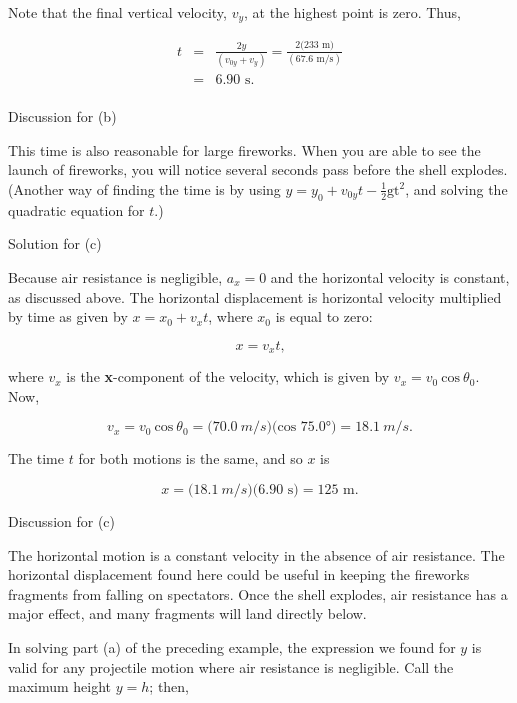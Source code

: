 \documentclass[
]{book}
\begin{document}
Note that the final vertical velocity, \(v_{y}{}\), at the highest point
is zero. Thus,

\leavevmode{}%
\[\begin{array}{lll}
t & = & {\frac{2y}{({v_{0y} + v_{y}})} = \frac{{2(\text{233\ m}})}{(\text{67.6\ m/s})}} \\
 & = & {\text{6.90\ s}\text{.}} \\
\end{array}{}\]

{Discussion for (b)}

This time is also reasonable for large fireworks. When you are able to
see the launch of fireworks, you will notice several seconds pass before
the shell explodes. (Another way of finding the time is by using
\({{y = {y_{0} + v_{0y}}}{t - \frac{1}{2}}\text{gt}^{2}}{}\), and solving
the quadratic equation for \(t{}\).)

{Solution for (c)}

Because air resistance is negligible, \({a_{x} = 0}{}\) and the horizontal
velocity is constant, as discussed above. The horizontal displacement is
horizontal velocity multiplied by time as given by
\({{x = {x_{0} + v_{x}}}t}{}\), where \(x_{0}{}\) is equal to zero:

\leavevmode{}%
\[{{x = v_{x}}t\text{,}}{}\]

where \(v_{x}{}\) is the \textbf{x}-component of the velocity, which is given
by \({{v_{x} = v_{0}}\ \text{cos}\ \theta_{0}\text{.}}{}\) Now,

\leavevmode{}%
\[{{v_{x} = v_{0}}\ \text{cos}\ {\theta_{0} = (}\text{70}\text{.}0\ m/s)(\text{cos\ 75.0°}{) = \text{18}}\text{.}1\ m/s.}{}\]

The time \(t{}\) for both motions is the same, and so \(x{}\) is

\leavevmode{}%
\[{{x = (}\text{18}\text{.}1\ m/s)(6\text{.}\text{90\ s}{) = \text{125\ m.}}}{}\]

{Discussion for (c)}

The horizontal motion is a constant velocity in the absence of air
resistance. The horizontal displacement found here could be useful in
keeping the fireworks fragments from falling on spectators. Once the
shell explodes, air resistance has a major effect, and many fragments
will land directly below.

In solving part (a) of the preceding example, the expression we found
for \(y{}\) is valid for any projectile motion where air resistance is
negligible. Call the maximum height \({y = h}{}\); then,
\end{document}
